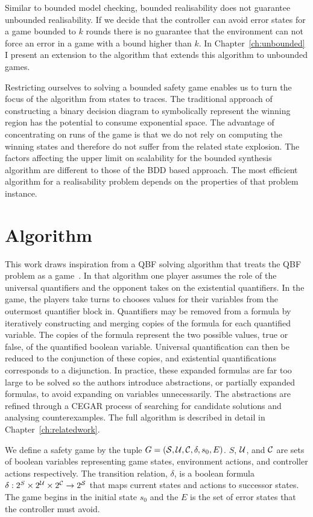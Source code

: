 Similar to bounded model checking, bounded realisability does not guarantee unbounded realisability.  If we decide that the controller can avoid error states for a game bounded to $k$ rounds there is no guarantee that the environment can not force an error in a game with a bound higher than $k$. In Chapter~\ref{ch:unbounded} I present an extension to the algorithm that extends this algorithm to unbounded games.

Restricting ourselves to solving a bounded safety game enables us to turn the focus of the algorithm from states to traces. The traditional approach of constructing a binary decision diagram to symbolically represent the winning region has the potential to consume exponential space. The advantage of concentrating on runs of the game is that we do not rely on computing the winning states and therefore do not suffer from the related state explosion. The factors affecting the upper limit on scalability for the bounded synthesis algorithm are different to those of the BDD based approach. The most efficient algorithm for a realisability problem depends on the properties of that problem instance.

\section{Algorithm}

This work draws inspiration from a QBF solving algorithm that treats the QBF problem as a game~\cite{Janota12}. In that algorithm one player assumes the role of the universal quantifiers and the opponent takes on the existential quantifiers. In the game, the players take turns to chooses values for their variables from the outermost quantifier block in. Quantifiers may be removed from a formula by iteratively constructing and merging copies of the formula for each quantified variable. The copies of the formula represent the two possible values, true or false, of the quantified boolean variable. Universal quantification can then be reduced to the conjunction of these copies, and existential quantifications corresponds to a disjunction. In practice, these expanded formulas are far too large to be solved so the authors introduce abstractions, or partially expanded formulas, to avoid expanding on variables unnecessarily. The abstractions are refined through a CEGAR process of searching for candidate solutions and analysing counterexamples. The full algorithm is described in detail in Chapter~\ref{ch:relatedwork}. 

We define a safety game by the tuple $G = (\mathcal{S}, \mathcal{U}, \mathcal{C}, \delta, s_0, E)$. $S$, $\mathcal{U}$, and $\mathcal{C}$ are sets of boolean variables representing game states, environment actions, and controller actions respectively. The transition relation, $\delta$, is a boolean formula $\delta : 2^{S} \times 2^{\mathcal{U}} \times 2^{\mathcal{C}} \to 2^{\mathcal{S}}$ that maps current states and actions to successor states. The game begins in the initial state $s_0$ and the $E$ is the set of error states that the controller must avoid.

